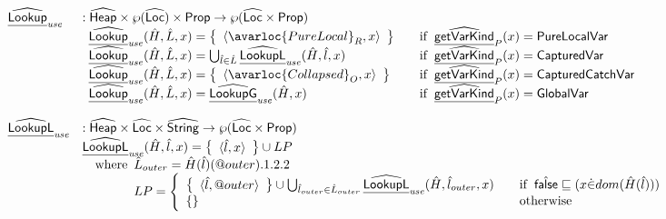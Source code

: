 \[
\begin{array}{ll}
\ahf{Lookup}_{\it use} & : \aHeap \times \powerset{\aLoc} \times \SF{Prop} \rightarrow \powerset{\aLoc \times \SF{Prop}}\\
& \begin{array}{ll}
  \ahf{Lookup}_{\it use}(\hat{H},\hat{L},x) = \set{\langle \avarloc{PureLocal}_R, x\rangle}&\quad\ifc{\ahf{getVarKind}_P(x) = \SF{PureLocalVar}}\\
  \ahf{Lookup}_{\it use}(\hat{H},\hat{L},x) = \bigcup_{\hat{l}\in\hat{L}}\ahf{LookupL}_{\it use}(\hat{H},\hat{l},x)&\quad\ifc{\ahf{getVarKind}_P(x) = \SF{CapturedVar}}\\
  \ahf{Lookup}_{\it use}(\hat{H},\hat{L},x) = \set{\langle \avarloc{Collapsed}_O, x\rangle}&\quad\ifc{\ahf{getVarKind}_P(x) = \SF{CapturedCatchVar}}\\
  \ahf{Lookup}_{\it use}(\hat{H},\hat{L},x) = \ahf{LookupG}_{\it use}(\hat{H},x)&\quad\ifc{\ahf{getVarKind}_P(x) = \SF{GlobalVar}}\\
  \end{array}
\\\\

\ahf{LookupL}_{\it use} & : \aHeap \times \aLoc \times \abs{String} \rightarrow \powerset{\aLoc \times \SF{Prop}}\\
& \ahf{LookupL}_{\it use}(\hat{H}, \hat{l}, x) = \set{\langle\hat{l},x\rangle} \cup LP\\
&\quad\wherec{
  \hat{L}_{outer} = \hat{H}(\hat{l})(\varprop{outer}).1.2.2\\
  LP=\left\{
    \begin{array}{ll}
      \set{\langle \hat{l},\varprop{outer}\rangle} \cup \bigcup_{\hat{l}_{outer}\in\hat{L}_{outer}}\ahf{LookupL}_{\it use}(\hat{H},\hat{l}_{outer},x) 
        & \quad\ifc{\afalse\sqsubseteq (x\dot{\in}dom(\hat{H}(\hat{l})))} \\
      \set{}&\quad\owc
    \end{array}
  \right.\\
}
\\\\


\end{array}\]

